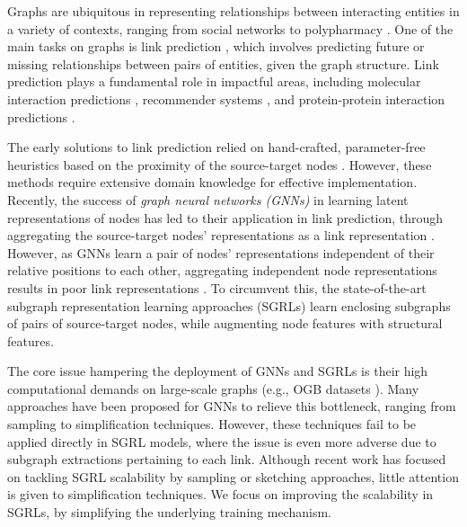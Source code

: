 \documentclass[sigconf, nonacm]{acmart}
\begin{document}
Graphs are ubiquitous in representing relationships between interacting entities in a variety of contexts, ranging from social networks \cite{chen2020friend} to polypharmacy \cite{zitnik2018modeling}. One of the main tasks on graphs is link prediction \cite{liben2003link}, which involves predicting future or missing relationships between pairs of entities, given the graph structure. Link prediction plays a fundamental role in impactful areas, including molecular interaction predictions \cite{huang2020skipgnn}, recommender systems \cite{ying2018graph}, and protein-protein interaction predictions \cite{zhong2022long}.



The early solutions to link prediction relied on hand-crafted, parameter-free heuristics based on the proximity of the source-target nodes \cite{page1999pagerank,adamic2003friends}.
However, these methods require extensive domain knowledge for effective implementation. Recently, the success of \textit{graph neural networks (GNNs)} in learning latent
representations of nodes \cite{kipf2017semi} has led to their application in link prediction, through aggregating the source-target nodes' representations as a link representation \cite{kipf2016variational,pan2018adversarially}. However, as GNNs learn a pair of nodes' representations independent of their relative positions to each other, aggregating independent node representations results in poor link representations \cite{zhang2021labeling}. To circumvent this, the state-of-the-art subgraph representation learning approaches (SGRLs) \cite{zhang2018link} learn enclosing subgraphs of pairs of source-target nodes, while augmenting node features with structural features.

The core issue hampering the deployment of GNNs and SGRLs is their high computational demands on large-scale graphs (e.g., OGB datasets \cite{hu2020ogb,hu2021ogb}). Many approaches have been proposed for GNNs to relieve this bottleneck, ranging from sampling \cite{chen2018fastgcn,graphsaint-iclr20} to simplification \cite{wu2019simplifying} techniques. However, these techniques fail to be applied directly in SGRL models, where the issue is even more adverse due to subgraph extractions pertaining to each link. Although recent work has focused on tackling SGRL scalability by sampling \cite{yin2022algorithm,louis2022sampling} or sketching \cite{chamberlain2023graph} approaches, little attention is given to simplification techniques. We focus on improving the scalability in SGRLs, by simplifying the underlying training mechanism.
\end{document}
